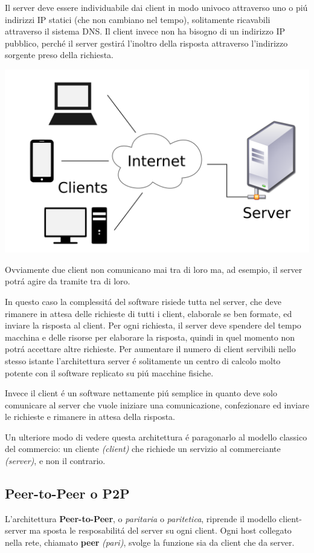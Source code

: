 \documentclass[12pt]{article}
\begin{document}
Il server deve essere individuabile dai client in modo univoco attraverso uno o pi\'u indirizzi IP statici (che non cambiano 
nel tempo), solitamente ricavabili attraverso il sistema DNS. Il client invece non ha bisogno di un indirizzo IP pubblico, 
perch\'e il server gestir\'a l'inoltro della risposta attraverso l'indirizzo sorgente preso della richiesta. 
\begin{center}
	\includegraphics[scale=0.15]{applicazione-img1.png}
\end{center}
Ovviamente due client non comunicano mai tra di loro ma, ad esempio, il server potr\'a agire da tramite tra di loro.

In questo caso la complessit\'a del software risiede tutta nel server, che deve rimanere in attesa delle richieste di tutti i
client, elaborale se ben formate, ed inviare la risposta al client. Per ogni richiesta, il server deve spendere del 
tempo macchina e delle risorse per elaborare la risposta, quindi in quel momento non potr\'a accettare altre richieste. Per 
aumentare il numero di client servibili nello stesso istante l'architettura server \'e solitamente un centro di 
calcolo molto potente con il software replicato su pi\'u macchine fisiche.

Invece il client \'e un software nettamente pi\'u semplice in quanto deve solo comunicare al server che vuole iniziare una 
comunicazione, confezionare ed inviare le richieste e rimanere in attesa della risposta.

Un ulteriore modo di vedere questa architettura \'e paragonarlo al modello classico del commercio: un cliente \textit{(client)} 
che richiede un servizio al commerciante \textit{(server)}, e non il contrario.

\subsection{Peer-to-Peer o P2P}\label{p2p}
L'architettura \textbf{Peer-to-Peer}, o \textit{paritaria} o \textit{paritetica}, riprende il modello client-server ma sposta 
le resposabilit\'a del server su ogni client. Ogni host collegato nella rete, chiamato \textbf{peer} \textit{(pari)}, svolge la 
funzione sia da client che da server.
\end{document}
